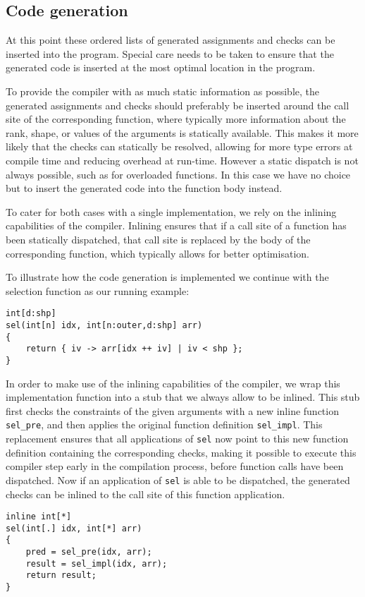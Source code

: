 \subsection{Code generation}\label{sec:generation}

At this point these ordered lists of generated assignments and checks can be inserted into the program.
Special care needs to be taken to ensure that the generated code is inserted at the most optimal location in the program.

To provide the compiler with as much static information as possible, the generated assignments and checks should preferably be inserted around the call site of the corresponding function, where typically more information about the rank, shape, or values of the arguments is statically available.
This makes it more likely that the checks can statically be resolved, allowing for more type errors at compile time and reducing overhead at run-time.
However a static dispatch is not always possible, such as for overloaded functions.
In this case we have no choice but to insert the generated code into the function body instead.

To cater for both cases with a single implementation, we rely on the inlining capabilities of the compiler.
Inlining ensures that if a call site of a function has been statically dispatched, that call site is replaced by the body of the corresponding function, which typically allows for better optimisation.

To illustrate how the code generation is implemented we continue with the selection function as our running example:
\begin{lstlisting}
int[d:shp]
sel(int[n] idx, int[n:outer,d:shp] arr)
{
    return { iv -> arr[idx ++ iv] | iv < shp };
}
\end{lstlisting}

\noindent
In order to make use of the inlining capabilities of the compiler, we wrap this implementation function into a stub that we always allow to be inlined.
This stub first checks the constraints of the given arguments with a new inline function \texttt{sel\_pre}, and then applies the original function definition \texttt{sel\_impl}.
This replacement ensures that all applications of \texttt{sel} now point to this new function definition containing the corresponding checks, making it possible to execute this compiler step early in the compilation process, before function calls have been dispatched.
Now if an application of \texttt{sel} is able to be dispatched, the generated checks can be inlined to the call site of this function application.
\begin{lstlisting}
inline int[*]
sel(int[.] idx, int[*] arr)
{
    pred = sel_pre(idx, arr);
    result = sel_impl(idx, arr);
    return result;
}
\end{lstlisting}

